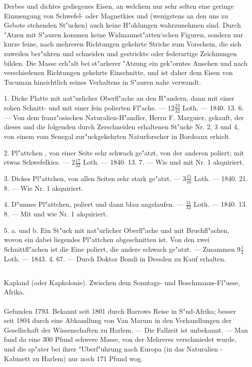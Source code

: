 \documentclass[a4paper, 11pt, oneside, polutonikogreek, german]{article}
\begin{document}
Derbes und dichtes gediegenes Eisen, an welchem nur sehr selten eine geringe Einmengung von Schwefel- oder Magnetkies und (wenigstens an den uns zu Gebote stehenden St"ucken) auch keine H"ohlungen wahrzunehmen sind. Durch "Atzen mit S"auren kommen keine Widmannst"atten‘schen Figuren, sondern nur kurze feine, nach mehreren Richtungen gekehrte Striche zum Vorschein, die sich zuweilen ber"uhren und schneiden und gestrickte oder federartige Zeichnungen bilden. Die Masse erh"alt bei st"arkerer "Atzung ein gek"orntes Ansehen und nach verschiedenen Richtungen gekehrte Einschnitte, und ist daher dem Eisen von Tucuman hinsichtlich seines Verhaltens in S"auren nahe verwandt.

1. Dicke Platte mit nat"urlicher Oberfl"ache an den R"andern, dann mit einer rohen Schnitt- und mit einer fein polierten Fl"ache. --- $12\frac{23}{32}$ Loth. --- 1840. 13. 6. --- Von dem franz"osischen Naturalien-H"andler, Herrn F. Marguier, gekauft, der dieses und die folgenden durch Zerschneiden erhaltenen St"ucke Nr. 2, 3 und 4, von einem vom Senegal zur"uckgekehrten Naturforscher in Bordeaux erhielt.

2. Pl"attchen , von einer Seite sehr schwach ge"atzt, von der anderen poliert; mit etwas Schwefelkies. --- $2\frac{17}{32}$ Loth. --- 1840. 13. 7. --- Wie und mit Nr. 1 akquiriert.

3. Dickes Pl"attchen, von allen Seiten sehr stark ge"atzt. --- $3\frac{15}{16}$ Loth. --- 1840. 21. 8. --- Wie Nr. 1 akquiriert.

4. D"unnes Pl"attchen, poliert und dann blau angelaufen. --- $\frac{31}{32}$ Loth. --- 1840. 13. 8. --- Mit und wie Nr. 1 akquiriert.

5. a. und b. Ein St"uck mit nat"urlicher Oberfl"ache und mit Bruchfl"achen, wovon ein dabei liegendes Pl"attchen abgeschnitten ist. Von den zwei Schnittfl"achen ist die Eine poliert, die andere schwach ge"atzt. --- Zusammen $9\frac{1}{4}$ Loth. --- 1843. 4. 67. --- Durch Doktor Bondi in Dresden zu Kauf erhalten.
\subsection{}
\begin{center}

Kapland (oder Kapkolonie). Zwischen dem Sonntags- und Boschmanns-Fl"usse, Afrika.
\end{center}
\paragraph{}
Gefunden 1793. Bekannt seit 1801 durch Barrows Reise in S"ud-Afrika; besser seit 1804 durch eine Abhandlung von Van Marum in den Verhandlungen der Gesellschaft der Wissenschaften zu Harlem. --- Die Fallzeit ist unbekannt. --- Man fand da eine 300 Pfund schwere Masse, von der Mehreres verschmiedet wurde, und die sp"ater bei ihrer "Uberf"uhrung nach Europa (in das Naturalien -Kabinett zu Harlem) nur noch 171 Pfund wog.
\end{document}
